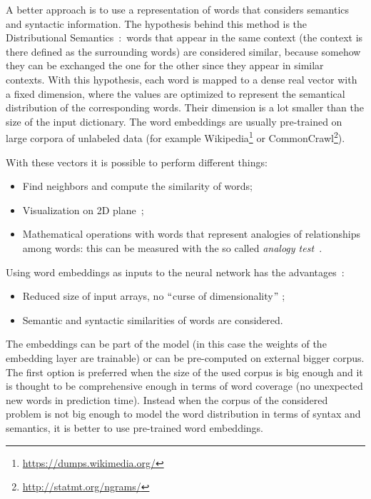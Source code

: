 A better approach is to use a representation of words that considers semantics and syntactic information. The hypothesis behind this method is the Distributional Semantics~\cite{sahlgren2008distributional}:\ words that appear in the same context (the context is there defined as the surrounding words) are considered similar, because somehow they can be exchanged the one for the other since they appear in similar contexts. With this hypothesis, each word is mapped to a dense real vector with a fixed dimension,  where the values are optimized to represent the semantical distribution of the corresponding words. Their dimension is a lot smaller than the size of the input dictionary. The word embeddings are usually pre-trained on large corpora of unlabeled data (for example Wikipedia\footnote{\url{https://dumps.wikimedia.org/}} or CommonCrawl\footnote{\url{http://statmt.org/ngrams/}}).

With these vectors it is possible to perform different things:

\begin{itemize}
	\item Find neighbors and compute the similarity of words;

	\item Visualization on 2D plane~\cite{maaten2008visualizing};

	\item Mathematical operations with words that represent analogies of relationships among words: this can be measured with the so called \textit{analogy test~\cite{mikolov2013linguistic}}.
\end{itemize}

Using word embeddings as inputs to the neural network has the advantages~\cite{bengio2003neural}:

\begin{itemize}
	\item Reduced size of input arrays, no $``$curse of dimensionality$"$ ;

	\item Semantic and syntactic similarities of words are considered.
\end{itemize}

The embeddings can be part of the model (in this case the weights of the embedding layer are trainable) or can be pre-computed on external bigger corpus. The first option is preferred when the size of the used corpus is big enough and it is thought to be comprehensive enough in terms of word coverage (no unexpected new words in prediction time). Instead when the corpus of the considered problem is not big enough to model the word distribution in terms of syntax and semantics, it is better to use pre-trained word embeddings.

